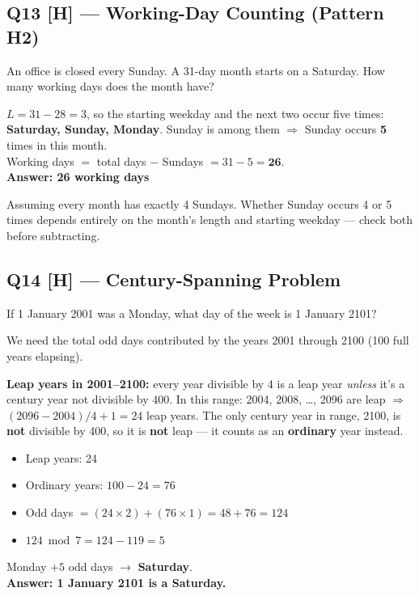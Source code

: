 \documentclass[11pt]{article}
\begin{document}
\subsection*{Q13 [H] --- Working-Day Counting (Pattern H2)}
An office is closed every Sunday. A 31-day month starts on a Saturday. How many working days does
the month have?

\begin{tipbox}[Solution]
$L = 31-28=3$, so the starting weekday and the next two occur five times: \textbf{Saturday, Sunday,
Monday}. Sunday is among them $\Rightarrow$ Sunday occurs \textbf{5} times in this month. \\
Working days $=$ total days $-$ Sundays $= 31-5 = \textbf{26}$.\\
\textbf{Answer: 26 working days}
\end{tipbox}

\begin{warnbox}
Assuming every month has exactly 4 Sundays. Whether Sunday occurs 4 or 5 times depends entirely on
the month's length and starting weekday --- check both before subtracting.
\end{warnbox}

\subsection*{Q14 [H] --- Century-Spanning Problem}
If 1 January 2001 was a Monday, what day of the week is 1 January 2101?

\begin{tipbox}[Solution]
We need the total odd days contributed by the years 2001 through 2100 (100 full years elapsing).

\textbf{Leap years in 2001--2100:} every year divisible by 4 is a leap year \emph{unless} it's a
century year not divisible by 400. In this range: 2004, 2008, \ldots, 2096 are leap
$\Rightarrow$ $(2096-2004)/4+1=24$ leap years. The only century year in range, 2100, is \textbf{not}
divisible by 400, so it is \textbf{not} leap --- it counts as an \textbf{ordinary} year instead.
\begin{itemize}[leftmargin=1.4em]
  \item Leap years: 24
  \item Ordinary years: $100-24=76$
  \item Odd days $= (24\times2)+(76\times1)=48+76=124$
  \item $124 \bmod 7 = 124-119=5$
\end{itemize}
Monday $+5$ odd days $\to$ \textbf{Saturday}.\\
\textbf{Answer: 1 January 2101 is a Saturday.}
\end{tipbox}
\end{document}
